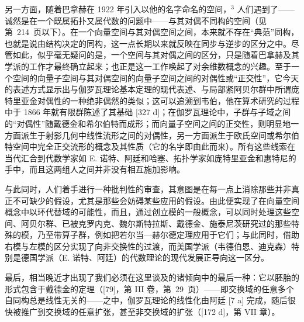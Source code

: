 另一方面，随着巴拿赫在 1922 年引入以他的名字命名的空间，\(^{3}\) 人们遇到了——诚然是在一个既属拓扑又属代数的问题中——与其对偶不同构的空间（见第~214~页以下）。在一个向量空间与其对偶空间之间，本来就不存在“典范”同构，也就是说由结构决定的同构，这一点长期以来就反映在同步与逆步的区分之中。尽管如此，似乎毫无疑问的是，一个空间与其对偶之间的区分，只是随着巴拿赫及其学派的工作才最终确立起来；也正是这一工作唤起了对余维数概念的兴趣。至于一个空间的向量子空间与其对偶空间的向量子空间之间的对偶性或“正交性”，它今天的表述方式显示出与伽罗瓦理论基本定理的现代表述、与局部紧阿贝尔群中所谓庞特里亚金对偶性的一种绝非偶然的类似；这可以追溯到韦伯，他在算术研究的过程中于 1866 年就有限群陈述了其基础 {[}327 d{]}；在伽罗瓦理论中，子群与子域之间的“对偶性”随戴德金和希尔伯特而成形；而向量子空间之间的正交性，则明显地一方面派生于射影几何中线性流形之间的对偶性，另一方面派生于欧氏空间或希尔伯特空间中完全正交流形的概念及其性质（它的名字即由此而来）。所有这些线索在当代汇合到代数学家如 E. 诺特、阿廷和哈塞、拓扑学家如庞特里亚金和惠特尼的手中，而且这两组人之间并非没有相互施加影响。

与此同时，人们着手进行一种批判性的审查，其意图是在每一点上消除那些并非真正不可缺少的假设，尤其是那些会妨碍某些应用的假设。由此便实现了在向量空间概念中以环代替域的可能性，而且，通过创立模的一般概念，可以同时处理这些空间、阿贝尔群、已被克罗内克、魏尔斯特拉斯、戴德金、施泰尼茨研究过的那些特殊的模，乃至带算子群，例如把若尔当—赫尔德定理应用于它们；与此同时，借助右模与左模的区分实现了向非交换性的过渡，而美国学派（韦德伯恩、迪克森）特别是德国学派（E. 诺特、阿廷）的代数理论的现代发展正导向这一区分。

最后，相当晚近才出现了我们必须在这里谈及的诸倾向中的最后一种：它以胚胎的形式包含于戴德金的定理（{[}79{]}，第 III 卷，第~29~页）——即交换域的任意多个自同构总是线性无关的——之中，伽罗瓦理论的线性化由阿廷 {[}7 a{]} 完成，随后很快被推广到交换域的任意扩张，甚至非交换域的扩张（{[}172 d{]}，第 VII 章）。

